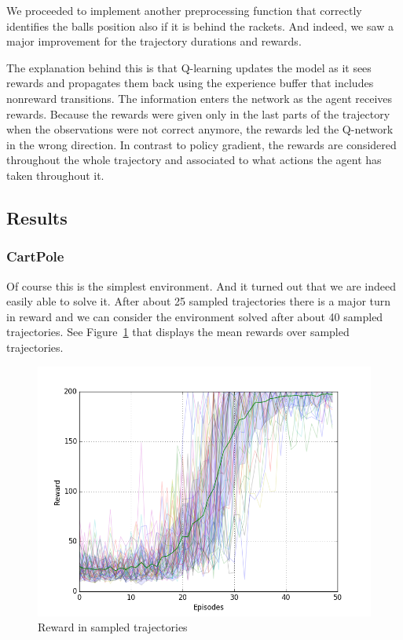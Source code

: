 \documentclass[10pt,a4paper]{article}
\begin{document}
We proceeded to implement another preprocessing function that correctly identifies the balls position also if it is behind the rackets. And indeed, we saw a major improvement for the trajectory durations and rewards.

The explanation behind this is that Q-learning updates the model as it sees rewards and propagates them back using the experience buffer that includes nonreward transitions. The information enters the network as the agent receives rewards. Because the rewards were given only in the last parts of the trajectory when the observations were not correct anymore, the rewards led the Q-network in the wrong direction. In contrast to policy gradient, the rewards are considered throughout the whole trajectory and associated to what actions the agent has taken throughout it.

\subsection{Results}

\subsubsection{CartPole}
Of course this is the simplest environment. And it turned out that we are indeed easily able to solve it. After about 25 sampled trajectories there is a major turn in reward and we can consider the environment solved after about 40 sampled trajectories. See Figure~\ref{fig:cartpole_reward} that displays the mean rewards over sampled trajectories.

\begin{figure}[!ht]
  \centering
  \includegraphics[width=1\textwidth]{./figures/cartpole_reward.png}
  \caption{Reward in sampled trajectories}
  \label{fig:cartpole_reward}
\end{figure}
\end{document}
